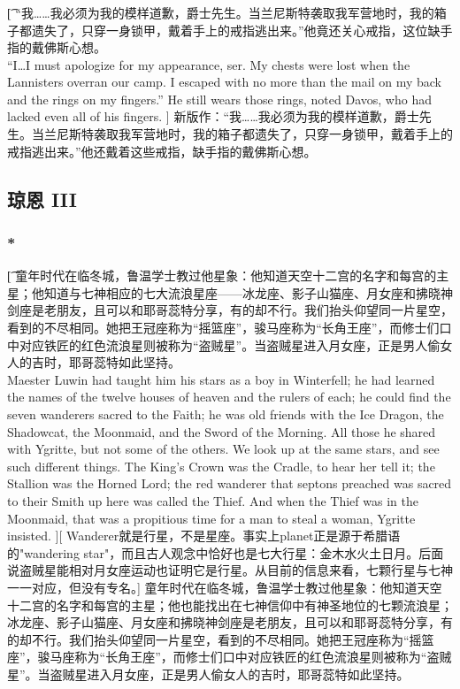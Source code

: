 \documentclass[12pt,a4paper]{article}
\begin{document}
\subsubsection{}\t[
	 “我……我必须为我的模样道歉，爵士先生。当兰尼斯特袭取我军营地时，我的箱子都遗失了，只穿一身锁甲，戴着手上的戒指逃出来。”他竟还关心戒指，这位缺手指的戴佛斯心想。\\
	 “I\ldots I must apologize for my appearance, ser. My chests were lost when the Lannisters overran our camp. I escaped with no more than the mail on my back and the rings on my fingers.” He still wears those rings, noted Davos, who had lacked even all of his fingers. ]
	 新版作：“我……我必须为我的模样道歉，爵士先生。当兰尼斯特袭取我军营地时，我的箱子都遗失了，只穿一身锁甲，戴着手上的戒指逃出来。”他还戴着这些戒指，缺手指的戴佛斯心想。
	 
\subsection{琼恩 III}
\subsubsection{\color{red}*}\t[
	童年时代在临冬城，鲁温学士教过他星象：他知道天空十二宫的名字和每宫的主星；他知道与七神相应的七大流浪星座——冰龙座、影子山猫座、月女座和拂晓神剑座是老朋友，且可以和耶哥蕊特分享，有的却不行。我们抬头仰望同一片星空，看到的不尽相同。她把王冠座称为“摇篮座”，骏马座称为“长角王座”，而修士们口中对应铁匠的红色流浪星则被称为“盗贼星”。当盗贼星进入月女座，正是男人偷女人的吉时，耶哥蕊特如此坚持。\\
	Maester Luwin had taught him his stars as a boy in Winterfell; he had learned the names of the twelve houses of heaven and the rulers of each; he could find the seven wanderers sacred to the Faith; he was old friends with the Ice Dragon, the Shadowcat, the Moonmaid, and the Sword of the Morning. All those he shared with Ygritte, but not some of the others. We look up at the same stars, and see such different things. The King's Crown was the Cradle, to hear her tell it; the Stallion was the Horned Lord; the red wanderer that septons preached was sacred to their Smith up here was called the Thief. And when the Thief was in the Moonmaid, that was a propitious time for a man to steal a woman, Ygritte insisted. ][
	Wanderer就是行星，不是星座。事实上planet正是源于希腊语的"wandering star"，而且古人观念中恰好也是七大行星：金木水火土日月。后面说盗贼星能相对月女座运动也证明它是行星。从目前的信息来看，七颗行星与七神一一对应，但没有专名。]
	童年时代在临冬城，鲁温学士教过他星象：他知道天空十二宫的名字和每宫的主星；他也能找出在七神信仰中有神圣地位的七颗流浪星；冰龙座、影子山猫座、月女座和拂晓神剑座是老朋友，且可以和耶哥蕊特分享，有的却不行。我们抬头仰望同一片星空，看到的不尽相同。她把王冠座称为“摇篮座”，骏马座称为“长角王座”，而修士们口中对应铁匠的红色流浪星则被称为“盗贼星”。当盗贼星进入月女座，正是男人偷女人的吉时，耶哥蕊特如此坚持。
	
\end{document}
